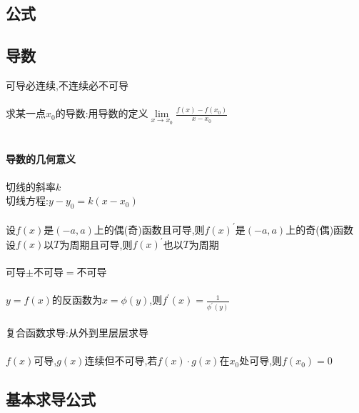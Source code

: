 \documentclass{article}
\begin{document}
\begin{flushleft}
	\huge
	
	\section{公式}
	
	\subsection{导数}
	
	可导必连续,不连续必不可导\\
	~\\
	求某一点$x_0$的导数:用导数的定义$\lim\limits_{x\to x_0} \frac{f(x)-f(x_0
		)}{x-x_0}$\\
	~\\
	\paragraph{导数的几何意义}
	切线的斜率$k$\\
	切线方程:$y-y_0=k(x-x_0)$\\
	~\\
	设$f(x)$是$(-a,a)$上的偶(奇)函数且可导,则$f(x)^{'}$是$(-a,a)$上的奇(偶)函数\\
	设$f(x)$以$T$为周期且可导,则$f(x)^{'}$也以$T$为周期\\
	~\\
	可导$\pm$不可导$=$不可导\\
	~\\
	$y=f(x)$的反函数为$x=\phi(y)$,则$f^{'}(x)=\frac{1}{\phi^{'}(y)}$\\
	~\\
	复合函数求导:从外到里层层求导\\
	~\\
	$f(x)$可导,$g(x)$连续但不可导,若$f(x)\cdot g(x)$在$x_0$处可导,则$f(x_0)=0$\\
	
	\subsection{基本求导公式}
	

\end{flushleft}
\end{document}
